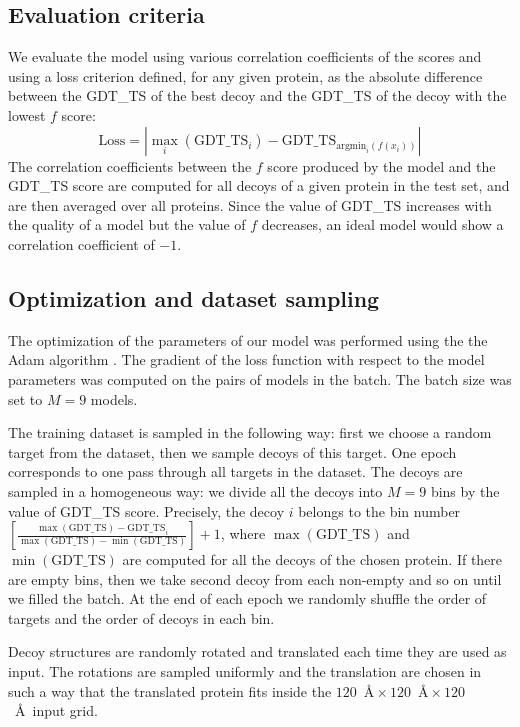 \subsection{Evaluation criteria}
We evaluate the model using various correlation coefficients of the
scores and using a loss criterion defined, for any given protein, as
the absolute difference between the GDT\_TS of the best decoy and the
GDT\_TS of the decoy with the lowest $f$ score:
$$ 
\text{Loss} = \left| \max_i( \text{GDT\_TS}_i ) - \text{GDT\_TS}_{\mathrm{argmin}_i(f(x_i))} \right|
$$
%
The correlation coefficients between the $f$ score produced by the
model and the GDT\_TS score are computed for all decoys of a given
protein in the test set, and are then averaged over all
proteins. Since the value of GDT\_TS increases with the quality of a
model but the value of $f$ decreases, an ideal model would show a
correlation coefficient of $-1$.


\subsection{Optimization and dataset sampling}
The optimization of the parameters of our model was performed
using the the Adam algorithm \cite{kingma2014adam}. The gradient of the loss 
function with respect to the model parameters was computed on the pairs of 
models in the batch. The batch size was set to $M = 9$ models.


The training dataset is sampled in the following way: first we choose a
random target from the dataset, then we sample decoys of this
target. One epoch corresponds to one pass through all targets in the
dataset. The decoys are sampled in a homogeneous way: we divide all
the decoys into $M = 9$ bins by the value of GDT\_TS score.
Precisely, the decoy $i$ belongs to the bin number $ \left[
  \frac{\max(\text{GDT\_TS}) - \text{GDT\_TS}_i}{\max(\text{GDT\_TS})
    - \min(\text{GDT\_TS})} \right] + 1$, where $\max(\text{GDT\_TS})$
and $\min(\text{GDT\_TS})$ are computed for all the decoys of the
chosen protein. If there are empty bins, then we take second decoy
from each non-empty and so on until we filled the batch. At the end
of each epoch we randomly shuffle the order of targets and the order
of decoys in each bin.

Decoy structures are randomly rotated and translated each time they
are used as input. The rotations are sampled uniformly
\cite{shoemake1992uniform} and the translation are chosen in such a
way that the translated protein fits inside the $120$~\AA${}\times
120$~\AA${}\times 120$~\AA\ input grid.

